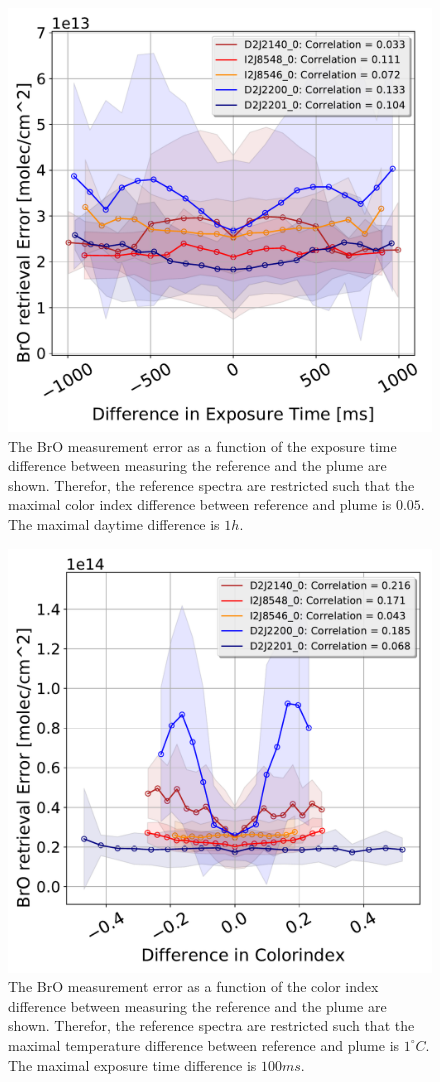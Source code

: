 \documentclass  [
  paper    = a4,
  BCOR     = 10mm,
  twoside,
  fontsize = 12pt,
  fleqn,
  toc      = bibnumbered,
  toc      = listofnumbered,
  numbers  = noendperiod,
  headings = normal,
  listof   = leveldown,
  version  = 3.03
]                                       {scrreprt}
\begin{document}
\begin{figure}
	\centering
	\includegraphics[width=0.7\linewidth]{Bilder/BrOErr_OhnEVar/DiffExpTimewithoutOtherparamallInstruments}
	\caption{The BrO measurement error as a function of the exposure time difference between measuring the reference and the plume are shown. Therefor, the reference spectra are restricted such that the maximal color index difference between reference and plume is $0.05$. The maximal daytime difference is $1h$.}
	\label{fig:diffexptimewithoutotherparamallinstruments}
\end{figure}
\begin{figure}
	\centering
	\includegraphics[width=0.7\linewidth]{Bilder/BrOErr_OhnEVar/DiffColidxwithoutOtherparamallInstruments}
	\caption{The BrO measurement error as a function of the color index difference between measuring the reference and the plume are shown. Therefor, the reference spectra are restricted such that the maximal temperature difference between reference and plume is $1^\circ C$. The maximal exposure time difference is $100 ms$.}
	\label{fig:diffcolidxwithoutotherparamallinstruments}
\end{figure}
\end{document}
